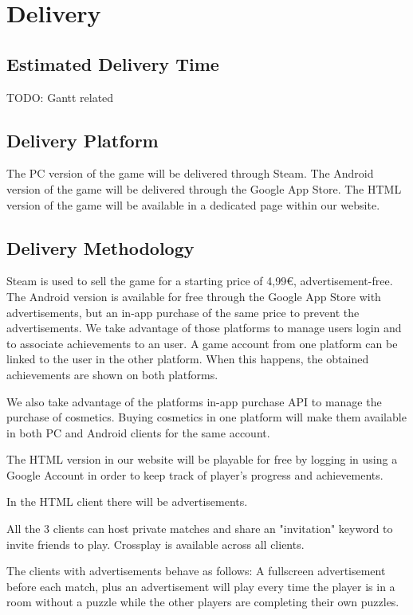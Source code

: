 \section{Delivery}
\subsection{Estimated Delivery Time}
TODO: Gantt related

\subsection{Delivery Platform}
The PC      version of the game will be delivered through Steam. 
The Android version of the game will be delivered through the Google App Store.
The HTML    version of the game will be available in a dedicated page within our website.

\subsection{Delivery Methodology}
Steam is used to sell the game for a starting price of 4,99€, advertisement-free.
The Android version is available for free through the Google App Store with advertisements, but an in-app purchase of the same price to prevent the advertisements.
We take advantage of those platforms to manage users login and to associate achievements to an user. A game account from one platform can be linked to the user in the other platform. When this happens, the obtained achievements are shown on both platforms. 


We also take advantage of the platforms in-app purchase API to manage the purchase of cosmetics. Buying cosmetics in one platform will make them available in both PC and Android clients for the same account.

The HTML version in our website will be playable for free by logging in using a Google Account in order to keep track of player's progress and achievements.

In the HTML client there will be advertisements.

All the 3 clients can host private matches and share an "invitation" keyword to invite friends to play. Crossplay is available across all clients.

The clients with advertisements behave as follows:
A fullscreen advertisement before each match, plus an advertisement will play every time the player is in a room without a puzzle while the other players are completing their own puzzles.

\pagebreak 